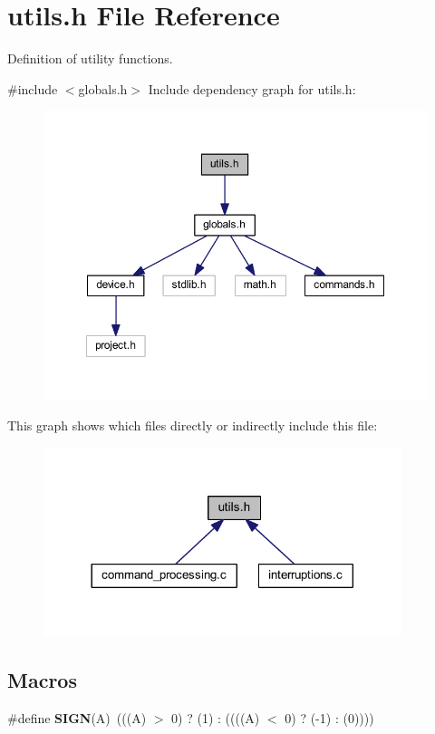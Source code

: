 \section{utils.\+h File Reference}
\label{utils_8h}


Definition of utility functions.  


{\ttfamily \#include $<$globals.\+h$>$}\newline
Include dependency graph for utils.\+h\+:
\nopagebreak
\begin{figure}[H]
\begin{center}
\leavevmode
\includegraphics[width=350pt]{utils_8h__incl}
\end{center}
\end{figure}
This graph shows which files directly or indirectly include this file\+:
\nopagebreak
\begin{figure}[H]
\begin{center}
\leavevmode
\includegraphics[width=296pt]{utils_8h__dep__incl}
\end{center}
\end{figure}
\subsection*{Macros}
\begin{DoxyCompactItemize}
\item 
\mbox{\label{utils_8h_a8c7db0cde6d591a5abad279ba92ef021}} 
\#define {\bfseries S\+I\+GN}(A)~(((A) $>$ 0) ? (1) \+: ((((A) $<$ 0) ? (-\/1) \+: (0))))
\end{DoxyCompactItemize}
